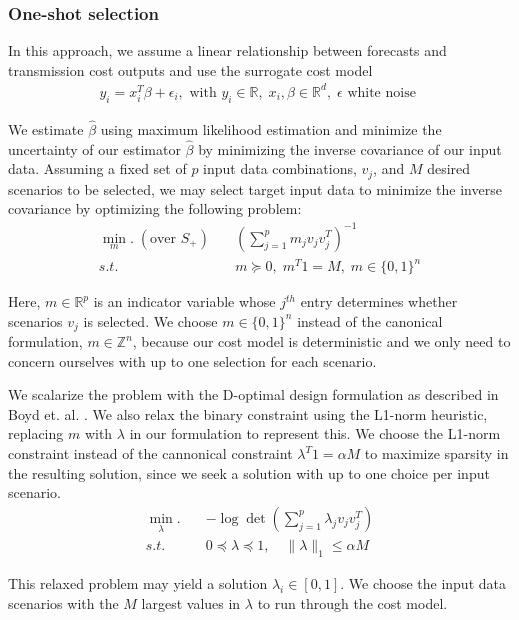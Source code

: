 \documentclass[10pt,twocolumn,letterpaper]{article}
\begin{document}
\subsubsection{One-shot selection}
In this approach, we assume a linear relationship between forecasts and transmission cost outputs and use the surrogate cost model 
\begin{align*}
    y_i = x_i^T\beta + \epsilon_i, \text{ with } y_i \in \mathbb{R}, \; x_i, \beta \in \mathbb{R}^d, \; \epsilon \text{ white noise }
\end{align*} 

We estimate $\hat{\beta}$ using maximum likelihood estimation and minimize the uncertainty of our estimator $\hat{\beta}$ by minimizing the inverse covariance of our input data. Assuming a fixed set of $p$ input data combinations, $v_j$, and $M$ desired scenarios to be selected, we may select target input data to minimize the inverse covariance by optimizing the following problem:
\begin{align*}
\min_m. \; (\textrm{over } S_+) \quad & \left(\sum_{j=1}^pm_jv_jv_j^T\right)^{-1}\\
s.t. \quad & m \succeq 0, \; m^T1 = M, \; m \in \{0, 1\}^n
\end{align*}

Here, $m\in \mathbb{R}^p$ is an indicator variable whose $j^{th}$ entry determines whether scenarios $v_j$ is selected. We choose $m \in \{0, 1\}^n$ instead of the canonical formulation, $m \in \mathbb{Z}^n$, because our cost model is deterministic and we only need to concern ourselves with up to one selection for each scenario.

We scalarize the problem with the D-optimal design formulation as described in Boyd et. al. \cite{boyd}. We also relax the binary constraint using the L1-norm heuristic, replacing $m$ with $\lambda$ in our formulation to represent this. We choose the L1-norm constraint instead of the cannonical constraint $\lambda^T1 = \alpha M$ to maximize sparsity in the resulting solution, since we seek a solution with up to one choice per input scenario. 
\begin{align*}
    \min_\lambda. \quad & -\log\det \left(\sum_{j=1}^p\lambda_jv_jv_j^T\right)\\
    s.t. \quad & 0 \preceq \lambda \preceq 1, \quad \lVert\lambda\rVert _1 \leq \alpha M
\end{align*}

This relaxed problem may yield a solution $\lambda_i \in [0, 1]$. We choose the input data scenarios with the $M$ largest values in $\lambda$ to run through the cost model.
\end{document}
